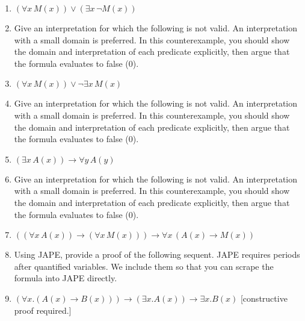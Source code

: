 \documentclass{cs81-homework}
\begin{document}
\begin{enumerate}
\item {} \((\forall x \, M(x)) \lor (\exists x \, \lnot M(x))\)

  \begin{solution}
  \end{solution}

\item[] Give an interpretation for which the following is not valid. An
  interpretation with a small domain is preferred. In this counterexample, you
  should show the domain and interpretation of each predicate explicitly, then
  argue that the formula evaluates to false (0).
  
\item {} \((\forall x \, M(x)) \lor \lnot \exists x \, M(x)\)

  \begin{solution}
  \end{solution}

\item[] Give an interpretation for which the following is not valid. An
  interpretation with a small domain is preferred. In this counterexample, you
  should show the domain and interpretation of each predicate explicitly, then
  argue that the formula evaluates to false (0).
  
\item {} \((\exists x \, A(x)) \to \forall y \, A(y)\)

  \begin{solution}
  \end{solution}

\item[] Give an interpretation for which the following is not valid. An
  interpretation with a small domain is preferred. In this counterexample, you
  should show the domain and interpretation of each predicate explicitly, then
  argue that the formula evaluates to false (0).

\item {}
  \(((\forall x \, A(x)) \to (\forall x \, M(x))) \to \forall x \, (A(x) \to
  M(x))\)

  \begin{solution}
  \end{solution}

\item[] Using JAPE, provide a proof of the following sequent. JAPE requires
  periods after quantified variables. We include them so that you can scrape the
  formula into JAPE directly.
\item {}
  \((\forall x.(A(x) \to B(x))) \to (\exists x.A(x))\to \exists x.B(x)\)
  [constructive proof required.]


\end{enumerate}
\end{document}
